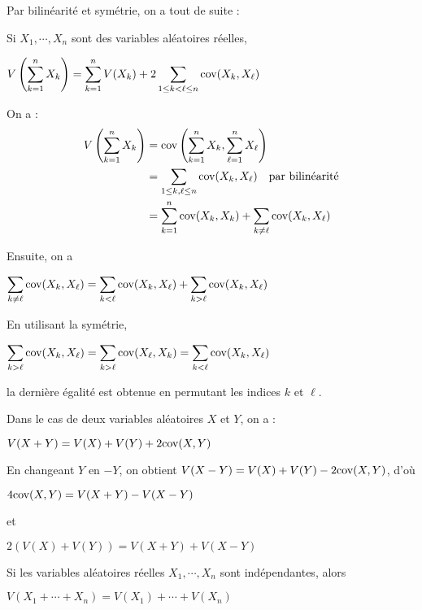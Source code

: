\documentclass[12pt,a4paper]{report}
\begin{document}
Par bilinéarité et symétrie, on a tout de suite :
\begin{proposition}{}{}
Si $X_1,\cdots,X_n$ sont des variables aléatoires réelles, 
\begin{center}
$\displaystyle V\left(\sum_{k=1}^n X_k\right) = \sum_{k=1}^n V(X_k) + 2 \sum_{1 \le k < \ell \le n} \text{cov}(X_k,X_\ell)$
\end{center}
\end{proposition}

\begin{demo}{}
On a :
\begin{align*}
V\left(\sum_{k=1}^n X_k\right) &= \text{cov}\left(\sum_{k=1}^n X_k,\sum_{\ell = 1}^n X_\ell\right) \\
&= \sum_{1 \le k,\ell \le n} \text{cov} (X_k,X_\ell) \quad \text{par bilinéarité} \\
&= \sum_{k=1}^n \text{cov}(X_k,X_k) + \sum_{k \ne \ell} \text{cov}(X_k,X_\ell)
\end{align*}

Ensuite, on a 
\begin{center}
$\displaystyle \sum_{k \ne \ell} \text{cov}(X_k,X_\ell) = \sum_{k<\ell} \text{cov}(X_k,X_\ell) + \sum_{k>\ell} \text{cov}(X_k,X_\ell)$
\end{center}
En utilisant la symétrie,
\begin{center}
$\displaystyle \sum_{k > \ell} \text{cov}(X_k,X_\ell) = \sum_{k>\ell} \text{cov}(X_\ell,X_k) = \sum_{k<\ell} \text{cov}(X_k,X_\ell)$
\end{center}
la dernière égalité est obtenue en permutant les indices $k$ et $\ell$.
\end{demo}

\begin{remarque}{}
Dans le cas de deux variables aléatoires $X$ et $Y$, on a :
\begin{center}
$V(X+Y) = V(X)+V(Y) + 2 \text{cov}(X,Y)$
\end{center}
En changeant $Y$ en $-Y$, on obtient $V(X-Y) = V(X)+V(Y)-2 \text{cov}(X,Y)$, d'où 
\begin{center}
$4\text{cov}(X,Y) = V(X+Y) - V(X-Y)$
\end{center}
et 
\begin{center}
$2(V(X)+V(Y)) = V(X+Y)+V(X-Y)$
\end{center}
\end{remarque}

\begin{proposition}{}
Si les variables aléatoires réelles $X_1,\cdots,X_n$ sont indépendantes, alors 
\begin{center}
$V(X_1+\cdots+X_n) = V(X_1) + \cdots + V(X_n)$
\end{center}
\end{proposition}
\end{document}
